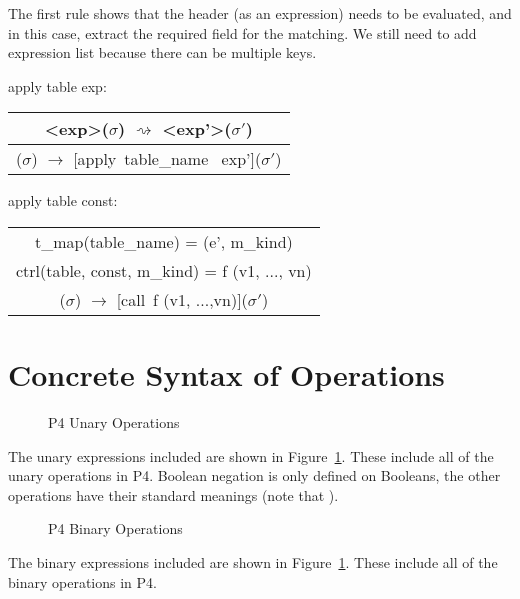 \documentclass[UTF8]{article}
\makeatletter
\newcommand*{\inference}[3][t]{%
   \begingroup
   \def\and{\\}%
   \begin{tabular}[#1]{@{\enspace}c@{\enspace}}
   #2 \\
   \hline
   #3
   \end{tabular}%
   \endgroup
}
\makeatother
\begin{document}
The first rule shows that the header (as an expression) needs to be evaluated, and in this case, extract the required field for the matching. 
We still need to add expression list because there can be multiple keys.

\bigskip
apply table exp:
\bigskip
\inference[c]{<exp>($\sigma$) $\rightsquigarrow$ <exp'>($\sigma '$) }
            {[apply table\_name exp]($\sigma$) $\rightarrow$ [apply\ table\_name \ exp']($\sigma'$)} \bigskip

\bigskip
apply table const:
\bigskip
\inference[c]{t\_map(table\_name) = (e', m\_kind)
            \and ctrl(table\name, const, m\_kind) = f (v1, ..., vn) } 
            {[apply table\_name const]($\sigma$) $\rightarrow$ [call\ f (v1, ...,vn)]($\sigma'$)}
\bigskip
              

\printbibliography

\clearpage
\appendix
\section{Concrete Syntax of Operations}
\label{app:op}
\begin{figure}[ht!]
\centering\ottgrammartabular{
\ottunop\ottafterlastrule
}
\caption{P4 Unary Operations}
\label{fig:unop}
\end{figure}

The unary expressions included are shown in Figure~\ref{fig:unop}. These include all of the unary operations in P4. Boolean negation is only defined on Booleans, the other operations have their standard meanings (note that ).

\newpage
\begin{figure}[ht!]
\centering\ottgrammartabular{
\ottbinop\ottafterlastrule
}
\caption{P4 Binary Operations}
\label{fig:binop}
\end{figure}

The binary expressions included are shown in Figure~\ref{fig:unop}. These include all of the binary operations in P4.
\end{document}
